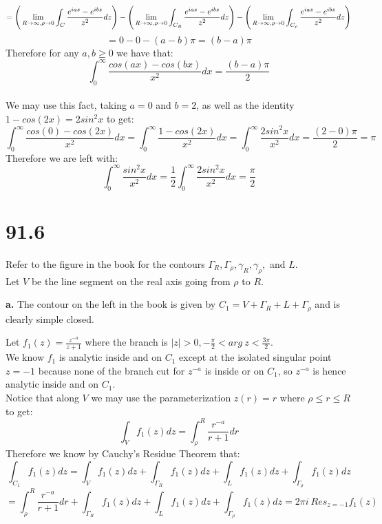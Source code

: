 \documentclass{article}
\begin{document}
\begin{center}
    \[=\Bigg{(}\lim _{R\rightarrow\infty,\rho\rightarrow 0}\int _{C}\frac{e^{iaz} - e^{ibz}}{z^2} dz\Bigg{)} -\Bigg{(}\lim _{R\rightarrow\infty,\rho\rightarrow 0}\int _{C_R}\frac{e^{iaz} - e^{ibz}}{z^2} dz\Bigg{)} -\Bigg{(}\lim _{R\rightarrow\infty,\rho\rightarrow 0}\int _{C_{\rho}}\frac{e^{iaz} - e^{ibz}}{z^2} dz\Bigg{)}\]
    \[= 0 - 0 - (a - b)\pi = (b - a)\pi\]
    Therefore for any $a, b\geq 0$ we have that:
    \[\int _0^{\infty}\frac{cos(ax) - cos(bx)}{x^2} dx =\frac{(b - a)\pi}{2}\]
    \qedsymbol
    \\We may use this fact, taking $a = 0$ and $b = 2$, as well as the identity $1 - cos(2x) = 2sin^2 x$ to get:
    \[\int _0^{\infty}\frac{cos(0) - cos(2x)}{x^2} dx =\int _0^{\infty}\frac{1 - cos(2x)}{x^2} dx =\int _0^{\infty}\frac{2sin^2 x}{x^2} dx =\frac{(2 - 0)\pi}{2} =\pi\]
    Therefore we are left with:
    \[\int _0^{\infty}\frac{sin^2 x}{x^2} dx =\frac{1}{2}\int _0^{\infty}\frac{2sin^2 x}{x^2} dx =\frac{\pi}{2}\]
\end{center}


\newpage
\section*{91.6}
\begin{center}
    \doublespacing
    Refer to the figure in the book for the contours $\Gamma _R,\Gamma _{\rho},\gamma _R,\gamma _{\rho},$ and $L$.
    \\Let $V$ be the line segment on the real axis going from $\rho$ to $R$.
\end{center}

{\Large\textbf{a.}} The contour on the left in the book is given by $C_1 = V +\Gamma _R + L +\Gamma _{\rho}$ and is clearly simple closed.
\begin{center}
    \doublespacing
    Let $f_1 (z) =\frac{z^{-a}}{z+1}$ where the branch is $|z| > 0, -\frac{\pi}{2} < arg\:z <\frac{3\pi}{2}$.
    \\We know $f_1$ is analytic inside and on $C_1$ except at the isolated singular point $z = -1$ because none of the branch cut for $z^{-a}$ is inside or on $C_1$, so $z^{-a}$ is hence analytic inside and on $C_1$.
    \\Notice that along $V$ we may use the parameterization $z(r) = r$ where $\rho\leq r\leq R$ to get:
    \[\int _{V} f_1 (z) dz =\int _{\rho}^R\frac{r^{-a}}{r+1} dr\]
    Therefore we know by Cauchy's Residue Theorem that:
    \[\int _{C_1} f_1 (z) dz =\int _{V} f_1 (z) dz +\int _{\Gamma _R} f_1 (z) dz +\int _{L} f_1 (z) dz +\int _{\Gamma _{\rho}} f_1 (z) dz\]
    \[=\int _{\rho}^R\frac{r^{-a}}{r+1} dr +\int _{\Gamma _R} f_1 (z) dz +\int _{L} f_1 (z) dz +\int _{\Gamma _{\rho}} f_1 (z) dz = 2\pi i\:Res_{z=-1} f_1 (z)\]
\end{center}
\end{document}
